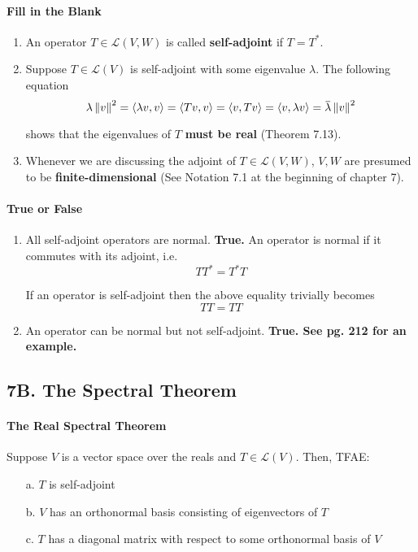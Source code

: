 \documentclass{article}
\newcommand{\norm}[1]{\left\lVert#1\right\rVert}
\newcommand{\iprod}[2]{\left\langle#1,#2\right\rangle}
\newcommand{\overbar}[1]{\mkern 1.5mu\overline{\mkern-1.5mu#1\mkern-1.5mu}\mkern 1.5mu}
\begin{document}
\paragraph{Fill in the Blank}
\begin{enumerate}
    \item An operator $T \in \mathcal{L}(V, W)$ is called
    \textbf{self-adjoint} if $T = T^*$.
    
    \item Suppose $T \in \mathcal{L}(V)$ is self-adjoint with some  eigenvalue $\lambda$. The following equation
    \[
        \lambda \norm{v}^2 = \iprod{\lambda v}{v} = 
        \iprod{Tv}{v} = \iprod{v}{Tv} = \iprod{v}{\lambda v}
        = \overbar{\lambda}\norm{v}^2
    \]
    
    shows that the eigenvalues of $T$ \textbf{must be real} (Theorem 7.13).
    
    \item  Whenever we are discussing the adjoint of $T \in \mathcal{L}(V, W)$, $V, W$ are presumed to be \textbf{finite-dimensional} (See Notation 7.1 at the beginning of chapter 7).
\end{enumerate}

\paragraph{True or False}
\begin{enumerate}
    \item All self-adjoint operators are normal. \textbf{True.} An operator is normal if it commutes with its adjoint, i.e.
    \[ TT^* = T^*T \]
    
    If an operator is self-adjoint then the above equality trivially becomes
    \[ TT = TT \]
    \item An operator can be normal but not self-adjoint. \textbf{True. See pg. 212 for an example.}
\end{enumerate}

\subsection*{7B. The Spectral Theorem}
\paragraph{The Real Spectral Theorem}
Suppose $V$ is a vector space over the reals and $T \in \mathcal{L}(V)$. Then, TFAE:
\begin{enumerate}
    \item[a.] $T$ is self-adjoint
    \item[b.] $V$ has an orthonormal basis consisting of eigenvectors of $T$
    \item[c.] $T$ has a diagonal matrix with respect to some orthonormal basis of $V$
\end{enumerate}
\end{document}
